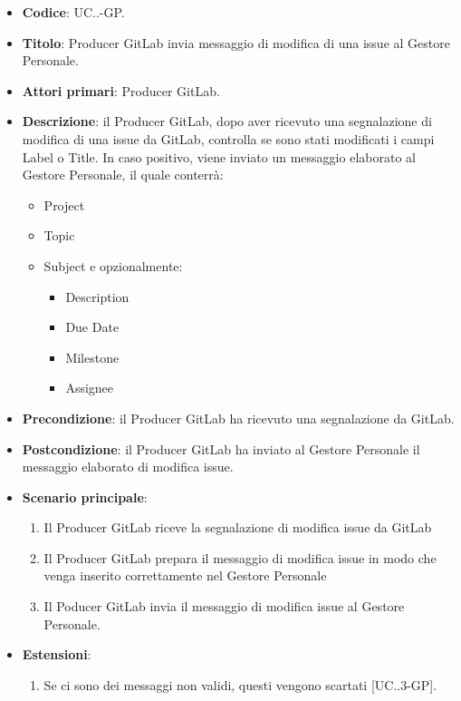 			\begin{itemize}
				\item \textbf{Codice}: UC\theuccount.\thesubuccount.\thesubsubuccount-GP.
				\item \textbf{Titolo}: Producer GitLab invia messaggio di modifica di una issue al Gestore Personale.
				\item \textbf{Attori primari}: Producer GitLab.
				\item \textbf{Descrizione}: il Producer GitLab, dopo aver ricevuto una segnalazione di modifica di una issue da GitLab, controlla se sono stati modificati i campi Label o Title.
				In caso positivo, viene inviato un messaggio elaborato al Gestore Personale, il quale conterrà:
				\begin{itemize}
					\item Project
					\item Topic
					\item Subject e opzionalmente:
					\begin{itemize}
						\item Description
						\item Due Date
						\item Milestone
						\item Assignee
					\end{itemize}
				\end{itemize}
				\item \textbf{Precondizione}: il Producer GitLab ha ricevuto una segnalazione da GitLab.
				\item \textbf{Postcondizione}: il Producer GitLab ha inviato al Gestore Personale il messaggio   \newline elaborato di modifica issue.
				\item \textbf{Scenario principale}: 
				\begin{enumerate}
					\item Il Producer GitLab riceve la segnalazione di modifica issue da GitLab
					\item Il Producer GitLab prepara il messaggio di modifica issue in modo che venga inserito correttamente nel Gestore Personale
					\item Il Poducer GitLab invia il messaggio di modifica issue al Gestore Personale.
				\end{enumerate}
				\item \textbf{Estensioni}: 
				\begin{enumerate}
					\item Se ci sono dei messaggi non validi, questi vengono scartati [UC\theuccount.\thesubuccount.3-GP].
				\end{enumerate}
			\end{itemize}
		
